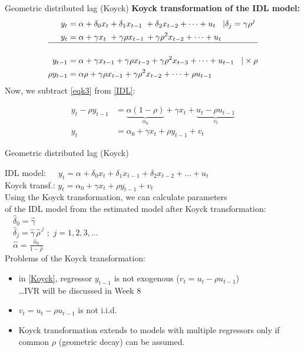 \documentclass{beamer}
\begin{document}
\begin{frame}{Geometric distributed lag (Koyck) }
\textbf{Koyck transformation of the IDL model:}
\begin{align} 
y_t & = \alpha + \delta_0 x_t  + \delta_1 x_{t-1} \,\,+ \delta_2 x_{t-2} + \dots + u_t \hspace{0.3cm} |\delta_j = \gamma \rho^j  \notag \\
y_t & = \alpha + \gamma x_t \,\,+ \gamma\rho x_{t-1} \,+ \gamma\rho^2 x_{t-2}+\dots + u_t  \label{IDL} \\ 
\hline \notag \\ 
y_{t-1} & = \alpha + \gamma x_{t-1} + \gamma\rho x_{t-2} + \gamma\rho^2 x_{t-3} + \dots+u_{t-1} \hspace{0.3cm} |\times \rho 
\\ \label{eqk3}
\rho y_{t-1} & = \alpha\rho + \gamma\rho x_{t-1} + \gamma \rho^2 x_{t-2} + \dots + \rho u_{t-1}
\end{align}
\centering Now, we subtract \eqref{eqk3} from \eqref{IDL}: \par
\begin{align}
y_t-\rho y_{t-1} & = \underbrace{\alpha(1-\rho)}_{\alpha_{0}}+\gamma x_t + \underbrace{u_t-\rho u_{t-1}}_{v_t}\\
y_t & = \alpha_0 + \gamma x_t + \rho y_{t-1} + v_t \label{Koyck}
\end{align}
\end{frame}

\begin{frame}{Geometric distributed lag (Koyck) }

IDL model: $\quad \,y_t = \alpha + \delta_0 x_t  + \delta_1 x_{t-1} + \delta_2 x_{t-2} + \dots + u_t $\\
\medskip
Koyck transf.: $y_t = \alpha_0 + \gamma x_t + \rho y_{t-1} + v_t$ \\
\medskip
Using the Koyck transformation, we can calculate parameters \\of the IDL model from the estimated model after Koyck transformation:\\
\medskip
$\quad \hat{\delta}_0 = \hat{\gamma}$ \\
\medskip
$\quad \hat{\delta}_j = \hat{\gamma} \, \hat{\rho}^{\,j} \,\, ; \,\, j = 1,2,3, \dots$ \\
\medskip
$\quad \hat{\alpha} = \frac{\hat{\alpha}_0}{1-\hat{\rho}}$\\
\medskip
Problems of the Koyck transformation:
\begin{itemize}
    \item in \eqref{Koyck}, regressor $y_{t-1}$ is not exogenous ($v_t=u_t-\rho u_{t-1}$)\\ \dots IVR will be discussed in Week 8
    \item $v_t=u_t-\rho u_{t-1}$ is not i.i.d.
    \item Koyck transformation extends to models with multiple regressors only if common $\rho$ (geometric decay) can be assumed.
\end{itemize}


\end{frame}
\end{document}
